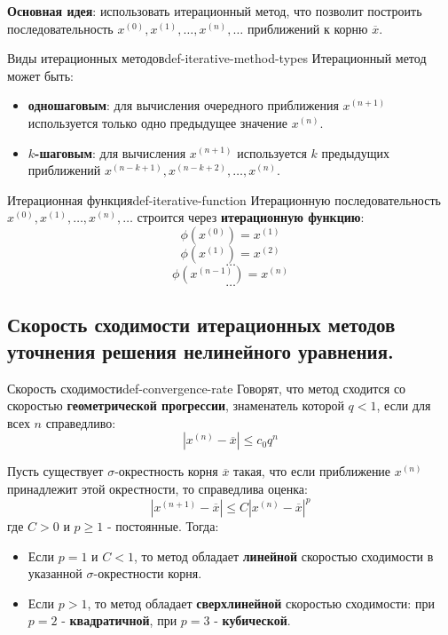 \documentclass[14pt]{extarticle}
\begin{document}
        \textbf{Основная идея}: использовать итерационный метод, что позволит построить последовательность $x^{(0)}, x^{(1)}, \ldots, x^{(n)}, \ldots$ приближений к корню $\overline{x}$.

        \begin{definition}{Виды итерационных методов}{def-iterative-method-types}
            Итерационный метод может быть: 
            \begin{itemize}
                \item \textbf{одношаговым}: для вычисления очередного приближения $x^{(n+1)}$ используется только одно предыдущее значение $x^{(n)}$.
                \item \textbf{$k$-шаговым}: для вычисления $x^{(n+1)}$ используется $k$ предыдущих приближений $x^{(n - k + 1)}, x^{(n - k + 2)}, \ldots, x^{(n)}$.
            \end{itemize}
        \end{definition}

        \begin{definition}{Итерационная функция}{def-iterative-function}
            Итерационную последовательность $x^{(0)}, x^{(1)}, \ldots, x^{(n)}, \ldots$ строится через \textbf{итерационную функцию}:
            $$\phi(x^{(0)}) = x^{(1)}$$
            $$\phi(x^{(1)}) = x^{(2)}$$
            $$\ldots$$
            $$\phi(x^{(n-1)}) = x^{(n)}$$
            $$\ldots$$
        \end{definition}

\clearpage
\subsection{Скорость сходимости итерационных методов уточнения решения нелинейного уравнения.}

    \begin{definition}{Скорость сходимости}{def-convergence-rate}
        Говорят, что метод сходится со скоростью \textbf{геометрической прогрессии}, знаменатель которой $q < 1$, если для всех $n$ справедливо:
        $$|x^{(n)} - \overline{x}| \leq c_{0}q^{n}$$

        Пусть существует $\sigma$-окрестность корня $\overline{x}$ такая, что если приближение $x^{(n)}$ принадлежит этой окрестности, то справедлива оценка:
        $$|x^{(n + 1)} - \overline{x}| \leq C|x^{(n)} - \overline{x}|^{p}$$
        где $C > 0$ и $p \geq 1$ - постоянные. Тогда:
        
        \begin{itemize}
            \item Если $p = 1$ и $C < 1$, то метод обладает \textbf{линейной} скоростью сходимости в указанной $\sigma$-окрестности корня.
            \item Если $p > 1$, то метод обладает \textbf{сверхлинейной} скоростью сходимости: при $p = 2$ - \textbf{квадратичной}, при $p = 3$ - \textbf{кубической}.
        \end{itemize}
    \end{definition}
\end{document}
